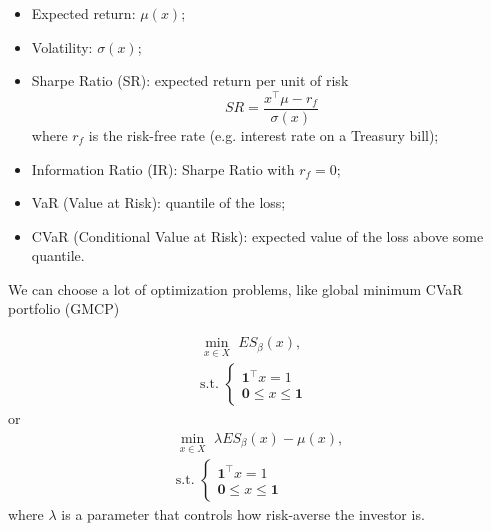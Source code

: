 \begin{itemize}
	\item Expected return: $\mu(x)$;
	\item Volatility: $\sigma(x)$;
	\item Sharpe Ratio (SR): expected return per unit of risk
	      \[
		      SR = \frac{x^\top \mu - r_f}{\sigma(x)}
	      \]
	      where $r_f$ is the risk-free rate (e.g. interest rate on a Treasury bill);
	\item Information Ratio (IR): Sharpe Ratio with $r_f=0$;
	\item VaR (Value at Risk): quantile of the loss;
	\item CVaR (Conditional Value at Risk): expected value of the loss above some quantile.
\end{itemize}

We can choose a lot of optimization problems, like global minimum CVaR portfolio (GMCP)

\begin{eqnarray}\label{prob:GMCP}
	\min_{x\in X} \,\, ES_\beta(x), \\
	\mbox{s.t. }\left\{
	\begin{aligned}\nonumber
		\mathbf{1}^\top x=1   & \\
		\mathbf{0}\leq x \leq \mathbf{1}
	\end{aligned}
	\right.
\end{eqnarray}
 or 
\begin{eqnarray}\label{prob:GMCP2}
	\min_{x\in X} \,\, \lambda ES_\beta(x) - \mu(x) , \\
	\mbox{s.t. }\left\{
	\begin{aligned}\nonumber
		\mathbf{1}^\top x=1   & \\
		\mathbf{0}\leq x \leq \mathbf{1}
	\end{aligned}
	\right.
\end{eqnarray}
where $\lambda$ is a parameter that controls how risk-averse the investor is.



